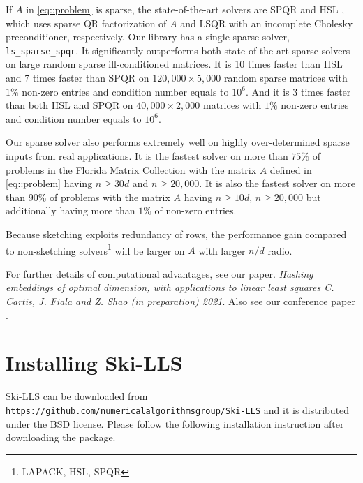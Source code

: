 \documentclass[english,11pt]{article}
\begin{document}
If $A$ in \eqref{eq::problem} is sparse, the state-of-the-art solvers are SPQR \cite{Davis:2011ft} and HSL \cite{Scott:2014iq}, which uses sparse QR factorization of $A$ and LSQR with an incomplete Cholesky preconditioner, respectively. Our library has a single sparse solver, {\tt ls_sparse_spqr}. It significantly outperforms both state-of-the-art sparse solvers on large random sparse ill-conditioned matrices. It is 10 times faster than HSL and 7 times faster than SPQR on $120,000 \times 5,000$ random sparse matrices with $1\%$ non-zero entries and condition number equals to $10^6$. And it is 3 times faster than both HSL and SPQR on $40,000 \times 2,000$ matrices with $1\%$ non-zero entries and condition number equals to $10^6$.

Our sparse solver also performs extremely well on highly over-determined sparse inputs from real applications. It is the fastest solver on more than $75 \%$ of problems in the Florida Matrix Collection \cite{Davis_2011} with the matrix $A$ defined in \eqref{eq::problem} having $n\geq 30d$ and $n \geq 20,000$. It is also the fastest solver on more than $90\%$ of problems with the matrix $A$ having $n\geq 10d$, $n \geq 20,000$ but additionally having more than $1\%$ of non-zero entries. 

Because sketching exploits redundancy of rows, the performance gain compared to non-sketching solvers\footnote{LAPACK, HSL, SPQR} will be larger on $A$ with larger $n/d$ radio.

For further details of computational advantages, see our paper. {\it{Hashing embeddings of optimal dimension, with applications to linear least squares
C. Cartis, J. Fiala and Z. Shao (in preparation) 2021}}. Also see our conference paper \cite{Zhen:ICML}.

\section{Installing Ski-LLS}
Ski-LLS can be downloaded from {\tt https://github.com/numericalalgorithmsgroup/Ski-LLS} and it is distributed under the BSD license. Please follow the following installation instruction after downloading the package. 
\end{document}
